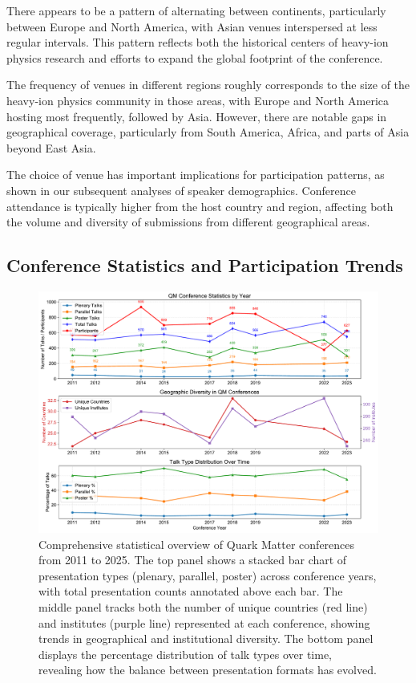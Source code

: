 \documentclass[a4paper,11pt]{article}
\begin{document}
There appears to be a pattern of alternating between continents, particularly between Europe and North America, with Asian venues interspersed at less regular intervals. This pattern reflects both the historical centers of heavy-ion physics research and efforts to expand the global footprint of the conference.

The frequency of venues in different regions roughly corresponds to the size of the heavy-ion physics community in those areas, with Europe and North America hosting most frequently, followed by Asia. However, there are notable gaps in geographical coverage, particularly from South America, Africa, and parts of Asia beyond East Asia.

The choice of venue has important implications for participation patterns, as shown in our subsequent analyses of speaker demographics. Conference attendance is typically higher from the host country and region, affecting both the volume and diversity of submissions from different geographical areas.

\subsection{Conference Statistics and Participation Trends}

\begin{figure}[H]
\centering
\includegraphics[width=\textwidth]{figures/QM_talk_statistics.pdf}
\caption{Comprehensive statistical overview of Quark Matter conferences from 2011 to 2025. The top panel shows a stacked bar chart of presentation types (plenary, parallel, poster) across conference years, with total presentation counts annotated above each bar. The middle panel tracks both the number of unique countries (red line) and institutes (purple line) represented at each conference, showing trends in geographical and institutional diversity. The bottom panel displays the percentage distribution of talk types over time, revealing how the balance between presentation formats has evolved.}
\label{fig:talk_statistics}
\end{figure}
\end{document}
